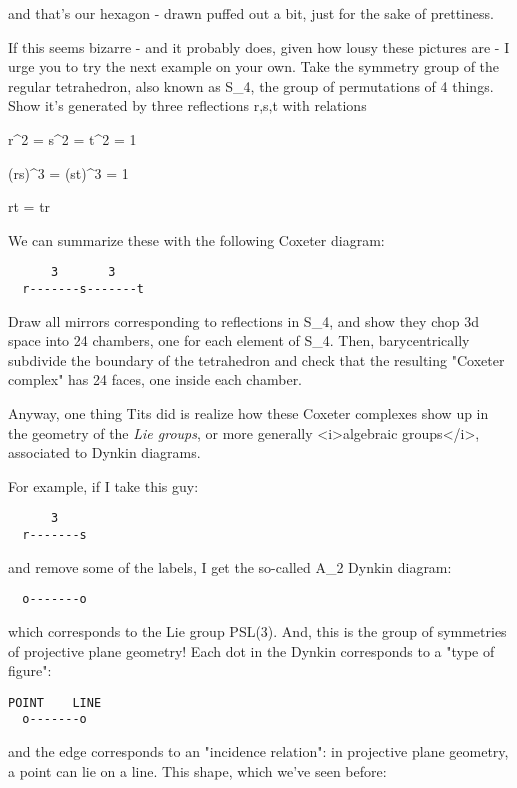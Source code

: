 and that's our hexagon - drawn puffed out a bit, just for the sake
of prettiness.

If this seems bizarre - and it probably does, given how lousy these
pictures are - I urge you to try the next example on your own.  Take
the symmetry group of the regular tetrahedron, also known as S_{4},
the group of permutations of 4 things.  Show it's generated by 
three reflections r,s,t with relations

r^{2} = s^{2} = t^{2} = 1

(rs)^{3} = (st)^{3} = 1

rt = tr

We can summarize these with the following Coxeter diagram:

\begin{verbatim}
      3       3
  r-------s-------t
\end{verbatim}
    
Draw all mirrors corresponding to reflections in S_{4}, and show 
they chop 3d space into 24 chambers, one for each element of S_{4}. 
Then, barycentrically subdivide the boundary of the tetrahedron 
and check that the resulting "Coxeter complex" has 24 faces, one 
inside each chamber.

Anyway, one thing Tits did is realize how these Coxeter complexes 
show up in the geometry of the \emph{Lie groups}, or more generally
<i>algebraic groups</i>, associated to Dynkin diagrams.  

For example, if I take this guy:

\begin{verbatim}
      3
  r-------s
\end{verbatim}
    

and remove some of the labels, I get the so-called A_{2}
Dynkin diagram:

\begin{verbatim}
  o-------o
\end{verbatim}
    
which corresponds to the Lie group PSL(3).  And, this is the group 
of symmetries of projective plane geometry!  Each dot in the Dynkin
corresponds to a "type of figure":

\begin{verbatim}
POINT    LINE
  o-------o
\end{verbatim}
    
and the edge corresponds to an "incidence relation": in projective
plane geometry, a point can lie on a line.   This shape, which we've
seen before:

